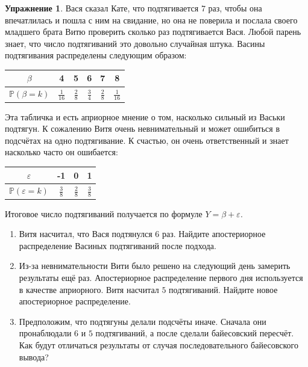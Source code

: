 \documentclass[12pt, a4paper, oneside]{extreport}
\def \mbb{\mathbb}
\def \PP{\mbb{P}}
\theoremstyle{plain}              %
\theoremstyle{definition}         %
\newtheorem{problem}{\color{myblue} Упражнение}
\begin{document}
\begin{problem}
Вася сказал Кате, что подтягивается $7$ раз, чтобы она впечатлилась и пошла с ним на свидание, но она не поверила и послала своего младшего брата Витю проверить сколько раз подтягивается Вася. Любой парень знает, что число подтягиваний это довольно случайная штука. Васины подтягивания распределены следующим образом: 

\begin{center}
	\begin{tabular}{c|c|c|c|c|c}
		$\beta$ & 4 & 5 & 6 & 7 & 8 \\ \hline
		$\PP(\beta = k)$ & $\frac{1}{16}$ & $\frac{2}{8}$ &  $\frac{3}{4}$ &  $\frac{2}{8}$ &  $\frac{1}{16}$ \\ 
	\end{tabular}
\end{center}

Эта табличка и есть априорное мнение о том, насколько сильный из Васьки подтягун. К сожалению Витя очень невнимательный и может ошибиться в подсчётах на одно подтягивание. К счастью, он очень ответственный и знает насколько часто он ошибается: 

\begin{center}
	\begin{tabular}{c|c|c|c}
		$\varepsilon$ & -1 & 0 & 1 \\ \hline
		$\PP(\varepsilon = k)$ & $\frac{3}{8}$ & $\frac{2}{8}$ &  $\frac{3}{8}$  \\ 
	\end{tabular}
\end{center}

Итоговое число подтягиваний получается по формуле  $Y = \beta + \varepsilon$.

\begin{enumerate}
	\item Витя насчитал, что Вася подтянулся $6$ раз.  Найдите апостериорное распределение Васиных подтягиваний после подхода. 
	
	\item Из-за невнимательности Вити было решено на следующий день замерить результаты ещё раз.  Апостериорное распределение первого дня используется в качестве априорного. Витя насчитал $5$ подтягиваний. Найдите новое апостериорное распределение. 
	
	\item Предположим, что подтягуны делали подсчёты иначе. Сначала они пронаблюдали $6$ и $5$ подтягиваний, а после сделали байесовский пересчёт. Как будут отличаться результаты от случая последовательного байесовского вывода? 
	

\end{enumerate}
\end{problem}
\end{document}
